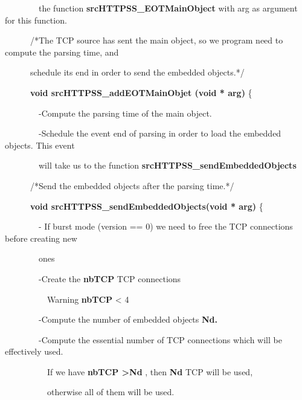 \documentclass[a4paper]{article}
\begin{document}
{
\ \ \ \ \ \ \ \ the function \textbf{srcHTTPSS\_EOTMainObject} with arg as argument for this function.}

\bigskip


\bigskip

{
\ \ \ \ \ \ /*The TCP source has sent the main object, so we program need to compute the parsing time, and}

{
\ \ \ \ \ \ schedule its end in order to send the embedded objects.*/}

{
\ \ \ \ \ \ \textbf{void srcHTTPSS\_addEOTMainObjet (void * arg)} \{}

{
\ \ \ \ \ \ \ \ {}-Compute the parsing time of the main object.}

{
\ \ \ \ \ \ \ \ {}-Schedule the event end of parsing in order to load the embedded objects. This event}

{
\ \ \ \ \ \ \ \ will take us to the function \textbf{srcHTTPSS\_sendEmbeddedObjects}}

\bigskip

{
\ \ \ \ \ \ /*Send the embedded objects after the parsing time.*/}

{
\ \ \ \ \ \ \textbf{void srcHTTPSS\_sendEmbeddedObjects(void * arg)} \{}

{
\ \ \ \ \ \ \ \ {}- If burst mode (version == 0) we need to free the TCP connections before creating new}

{
\ \ \ \ \ \ \ \ ones}

{
\ \ \ \ \ \ \ \ {}-Create the \textbf{nbTCP} TCP connections}

{
\ \ \ \ \ \ \ \ \ \ Warning \textbf{nbTCP} {\textless} 4}

{
\ \ \ \ \ \ \ \ {}-Compute the number of embedded objects \textbf{Nd.}}

{
\ \ \ \ \ \ \ \ {}-Compute the essential number of TCP connections which will be effectively used.}

{
\ \ \ \ \ \ \ \ \ \ If we have \textbf{nbTCP {\textgreater}Nd }, then \textbf{Nd }TCP will be used,}

{
\ \ \ \ \ \ \ \ \ \ otherwise all of them will be used.}
\end{document}
